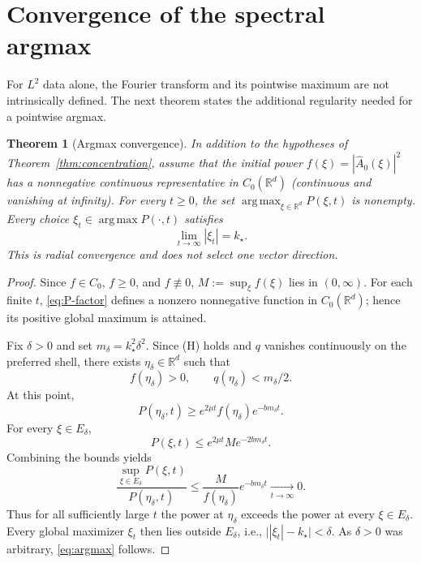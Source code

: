 \documentclass[11pt]{article}
\newtheorem{theorem}{Theorem}[section]
\theoremstyle{remark}
\newcommand{\R}{\mathbb R}
\newcommand{\abs}[1]{\left\lvert#1\right\rvert}
\DeclareMathOperator*{\argmax}{arg\,max}
\begin{document}
\section{Convergence of the spectral argmax}
For $L^2$ data alone, the Fourier transform and its pointwise
maximum are not intrinsically defined. The next theorem states the
additional regularity needed for a pointwise argmax.

\begin{theorem}[Argmax convergence]\label{thm:argmax}
In addition to the hypotheses of Theorem~\ref{thm:concentration},
assume that the initial power
$f(\xi)=\abs{\widehat A_0(\xi)}^2$ has a nonnegative continuous
representative in $C_0(\R^d)$ (continuous and vanishing at infinity).
For every $t\ge0$, the set $\argmax_{\xi\in\R^d}P(\xi,t)$ is
nonempty. Every choice
$\xi_t\in\argmax P(\cdot,t)$ satisfies
\begin{equation}\label{eq:argmax}
 \boxed{\displaystyle
 \lim_{t\to\infty}\abs{\xi_t}=k_\star.}
\end{equation}
This is radial convergence and does not select one vector direction.
\end{theorem}
\begin{proof}
Since $f\in C_0$, $f\ge0$, and $f\not\equiv0$,
$M:=\sup_{\xi}f(\xi)$ lies in $(0,\infty)$.
For each finite $t$, \eqref{eq:P-factor} defines a nonzero
nonnegative function in $C_0(\R^d)$; hence its positive global
maximum is attained.

Fix $\delta>0$ and set
$m_\delta=k_\star^2\delta^2$.
Since (H) holds and $q$ vanishes continuously on the preferred
shell, there exists $\eta_\delta\in\R^d$ such that
\begin{equation}\label{eq:eta}
 f(\eta_\delta)>0,
 \qquad q(\eta_\delta)<m_\delta/2.
\end{equation}
At this point,
\begin{equation}\label{eq:comparison-in}
 P(\eta_\delta,t)
 \ge e^{2\mu t}f(\eta_\delta)e^{-bm_\delta t}.
\end{equation}
For every $\xi\in E_\delta$,
\begin{equation}\label{eq:comparison-out}
 P(\xi,t)\le e^{2\mu t}M e^{-2bm_\delta t}.
\end{equation}
Combining the bounds yields
\begin{equation}\label{eq:ratio}
 \frac{\sup_{\xi\in E_\delta}P(\xi,t)}
 {P(\eta_\delta,t)}
 \le\frac{M}{f(\eta_\delta)}e^{-bm_\delta t}
 \xrightarrow[t\to\infty]{}0.
\end{equation}
Thus for all sufficiently large $t$ the power at $\eta_\delta$
exceeds the power at every $\xi\in E_\delta$.
Every global maximizer $\xi_t$ then lies outside $E_\delta$, i.e.,
$\lvert\abs{\xi_t}-k_\star\rvert<\delta$.
As $\delta>0$ was arbitrary, \eqref{eq:argmax} follows.
\end{proof}
\end{document}

